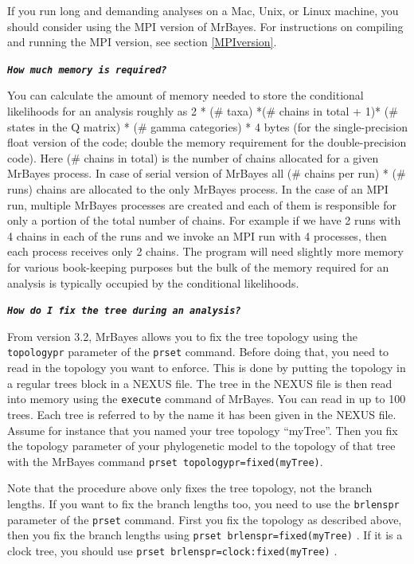 \documentclass[12pt]{book}
\newcommand{\ttt}[1]{\texttt{#1} }
\newcommand{\tb}[1]{\texttt{\textbf{#1}} }
\begin{document}
If you run long and demanding analyses on a Mac, Unix, or Linux machine, you should
consider using the MPI version of MrBayes. For instructions on compiling and running the
MPI version, see section \ref{MPIversion}.

\tb{\it{How much memory is required?}}

You can calculate the amount of memory needed to store the conditional likelihoods for
an analysis roughly as 2 * (\# taxa) *(\# chains in total + 1)* (\# states in the Q matrix)
* (\# gamma categories) * 4 bytes (for the single-precision float version of the code; double
the memory requirement for the double-precision code). Here (\# chains in total) is the number
of chains allocated for a given MrBayes process. In case of serial version of MrBayes all 
(\# chains per run) * (\# runs) chains are allocated to the only MrBayes process. In the case
 of an MPI run, multiple MrBayes processes are created and each of them is responsible for only a
portion of the total number of chains. For example if we have 2 runs with 4 chains in each of the runs
and we invoke an MPI run with 4 processes, then each process receives only 2 chains.
The program will need slightly more memory for various
book-keeping purposes but the bulk of the memory required for an analysis is typically
occupied by the conditional likelihoods.

\tb{\it{How do I fix the tree during an analysis?}}

From version 3.2, MrBayes allows you to fix the tree topology using the \texttt{topologypr} parameter
of the \texttt{prset} command. Before doing that, you need to read in the topology you want to 
enforce. This is done by putting the topology in a regular trees block in a NEXUS file. The tree
in the NEXUS file is then read into memory using the \texttt{execute} command of MrBayes. You
can read in up to 100 trees. Each tree is referred to by the name it has been given in the NEXUS
file. Assume for instance that you named your tree topology ``myTree''. Then you fix the
topology parameter of your phylogenetic model to the topology of that tree with the MrBayes command
\texttt{prset topologypr=fixed(myTree)}.

Note that the procedure above only fixes the tree topology, not the branch lengths. If you want to fix
the branch lengths too, you need to use the \texttt{brlenspr} parameter of the \texttt{prset} command.
First you fix the topology as described above, then you fix the branch lengths using
\ttt{prset brlenspr=fixed(myTree)}. If it is a clock tree, you should use \ttt{prset brlenspr=clock:fixed(myTree)}.
\end{document}
